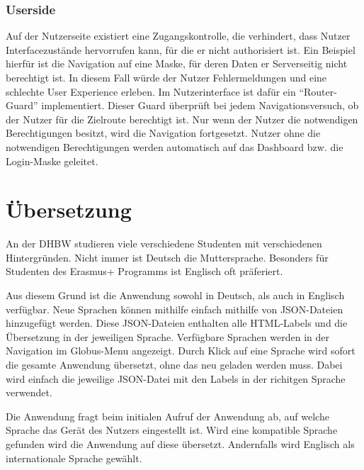 \subsubsection*{Userside}
Auf der Nutzerseite existiert eine Zugangskontrolle, die verhindert, dass Nutzer Interfacezustände hervorrufen kann, für die er nicht authorisiert ist.
Ein Beispiel hierfür ist die Navigation auf eine Maske, für deren Daten er Serverseitig nicht berechtigt ist.
In diesem Fall würde der Nutzer Fehlermeldungen und eine schlechte User Experience erleben.
Im Nutzerinterface ist dafür ein \enquote{Router-Guard} implementiert.
Dieser Guard überprüft bei jedem Navigationsversuch, ob der Nutzer für die Zielroute berechtigt ist.
Nur wenn der Nutzer die notwendigen Berechtigungen besitzt, wird die Navigation fortgesetzt.
Nutzer ohne die notwendigen Berechtigungen werden automatisch auf das Dashboard bzw. die Login-Maske geleitet.









\section{Übersetzung}

An der DHBW studieren viele verschiedene Studenten mit verschiedenen Hintergründen.
Nicht immer ist Deutsch die Muttersprache.
Besonders für Studenten des Erasmus+ Programms ist Englisch oft präferiert.

Aus diesem Grund ist die Anwendung sowohl in Deutsch, als auch in Englisch verfügbar.
Neue Sprachen können mithilfe einfach mithilfe von JSON-Dateien hinzugefügt werden.
Diese JSON-Dateien enthalten alle HTML-Labels und die Übersetzung in der jeweiligen Sprache. 
Verfügbare Sprachen werden in der Navigation im Globus-Menu angezeigt.
Durch Klick auf eine Sprache wird sofort die gesamte Anwendung übersetzt, ohne das neu geladen werden muss.
Dabei wird einfach die jeweilige JSON-Datei mit den Labels in der richitgen Sprache verwendet.

Die Anwendung fragt beim initialen Aufruf der Anwendung ab, auf welche Sprache das Gerät des Nutzers eingestellt ist.
Wird eine kompatible Sprache gefunden wird die Anwendung auf diese übersetzt.
Andernfalls wird Englisch als internationale Sprache gewählt.


